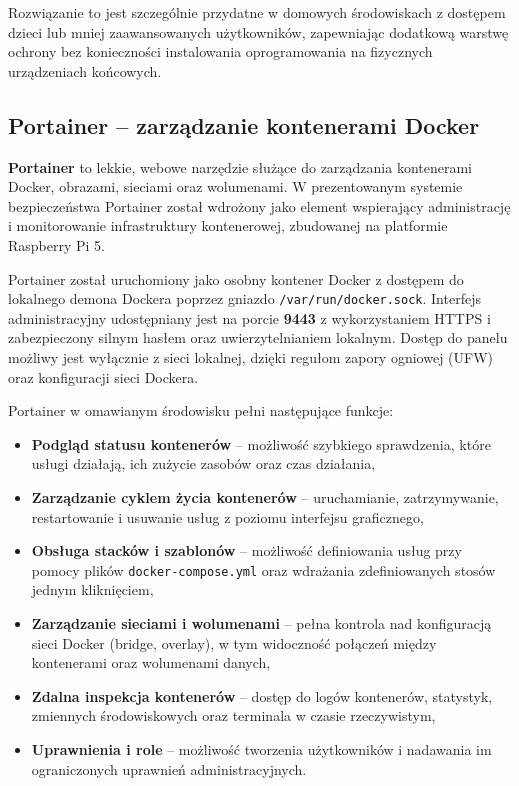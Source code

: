 \documentclass[
    left=2.5cm,         %
    right=2.5cm,        %
    top=2.5cm,          %
    bottom=3cm,         %
    bindingoffset=6mm,  %
    nohyphenation=true %
]{eiti/eiti-thesis} %
\begin{document}
Rozwiązanie to jest szczególnie przydatne w domowych środowiskach z dostępem dzieci lub mniej zaawansowanych użytkowników, zapewniając dodatkową warstwę ochrony bez konieczności instalowania oprogramowania na fizycznych urządzeniach końcowych.

\subsection{Portainer – zarządzanie kontenerami Docker}

\textbf{Portainer} to lekkie, webowe narzędzie służące do zarządzania kontenerami Docker, obrazami, sieciami oraz wolumenami. W prezentowanym systemie bezpieczeństwa Portainer został wdrożony jako element wspierający administrację i monitorowanie infrastruktury kontenerowej, zbudowanej na platformie Raspberry Pi 5.

Portainer został uruchomiony jako osobny kontener Docker z dostępem do lokalnego demona Dockera poprzez gniazdo \texttt{/var/run/docker.sock}. Interfejs administracyjny udostępniany jest na porcie \textbf{9443} z wykorzystaniem HTTPS i zabezpieczony silnym hasłem oraz uwierzytelnianiem lokalnym. Dostęp do panelu możliwy jest wyłącznie z sieci lokalnej, dzięki regułom zapory ogniowej (UFW) oraz konfiguracji sieci Dockera.

Portainer w omawianym środowisku pełni następujące funkcje:
\begin{itemize}
    \item \textbf{Podgląd statusu kontenerów} – możliwość szybkiego sprawdzenia, które usługi działają, ich zużycie zasobów oraz czas działania,
    \item \textbf{Zarządzanie cyklem życia kontenerów} – uruchamianie, zatrzymywanie, restartowanie i usuwanie usług z poziomu interfejsu graficznego,
    \item \textbf{Obsługa stacków i szablonów} – możliwość definiowania usług przy pomocy plików \texttt{docker-compose.yml} oraz wdrażania zdefiniowanych stosów jednym kliknięciem,
    \item \textbf{Zarządzanie sieciami i wolumenami} – pełna kontrola nad konfiguracją sieci Docker (bridge, overlay), w tym widoczność połączeń między kontenerami oraz wolumenami danych,
    \item \textbf{Zdalna inspekcja kontenerów} – dostęp do logów kontenerów, statystyk, zmiennych środowiskowych oraz terminala w czasie rzeczywistym,
    \item \textbf{Uprawnienia i role} – możliwość tworzenia użytkowników i nadawania im ograniczonych uprawnień administracyjnych.
\end{itemize}
\end{document}
